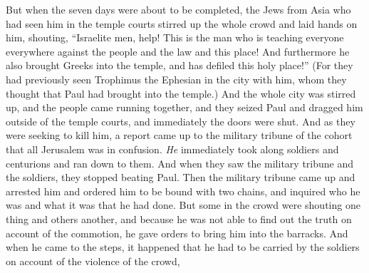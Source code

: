 \begin{biblechapter}
 But when the seven days were about to be completed, the Jews from Asia who had seen him in the temple courts stirred up the whole crowd and laid hands on him,
\verse shouting, “Israelite men, help! This is the man who is teaching everyone everywhere against the people and the law and this place! And furthermore he also brought Greeks into the temple, and has defiled this holy place!”
\verse (For they had previously seen Trophimus the Ephesian in the city with him, whom they thought that Paul had brought into the temple.)
\verse And the whole city was stirred up, and the people came running together, and they seized Paul and dragged him outside of the temple courts, and immediately the doors were shut.
\verse And as they were seeking to kill him, a report came up to the military tribune of the cohort that all Jerusalem was in confusion.
\verse \textit{He} immediately took along soldiers and centurions and ran down to them. And when they saw the military tribune and the soldiers, they stopped beating Paul.
\verse Then the military tribune came up and arrested him and ordered him to be bound with two chains, and inquired who he was and what it was that he had done.
\verse But some in the crowd were shouting one thing and others another, and because he was not able to find out the truth on account of the commotion, he gave orders to bring him into the barracks.
\verse And when he came to the steps, it happened that he had to be carried by the soldiers on account of the violence of the crowd,

\end{biblechapter}
